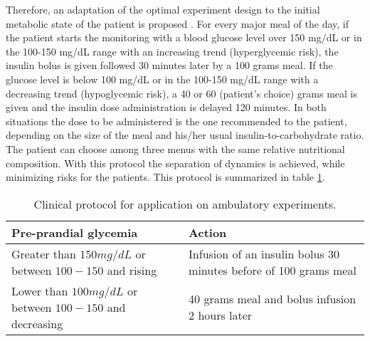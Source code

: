 Therefore, an adaptation of the optimal experiment design to the initial metabolic state of the patient is proposed \cite{DTMlaguna2010}. For every major meal of the day, if the patient starts the monitoring with a blood glucose level over 150 mg/dL or in the 100-150 mg/dL range with an increasing trend (hyperglycemic risk), the insulin bolus is given followed 30 minutes later by a 100 grams meal. If the glucose level is below 100 mg/dL or in the 100-150 mg/dL range with a decreasing trend (hypoglycemic risk), a 40 or 60 (patient's choice) grams meal is given and the insulin dose administration is delayed 120 minutes. In both situations the dose to be administered is the one recommended to the patient, depending on the size of the meal and his/her usual insulin-to-carbohydrate ratio. The patient can choose among three menus with the same relative nutritional composition. With this protocol the separation of dynamics is achieved, while minimizing risks for the patients. This protocol is summarized in table \ref{tab:protocol}.

\begin{table}[hbt]
	\centering
	\begin{tabular}{| p{} | p{} |}
	\hline 
	\textbf{Pre-prandial glycemia} & \textbf{Action}\\
	\hline 
	Greater than $150 mg/dL$ or between $100-150$ and rising & Infusion of an insulin bolus 30 minutes before of 100 grams meal \\
	\hline 
	Lower than $100 mg/dL$ or between $100-150$ and decreasing & 40 grams meal and bolus infusion 2 hours later \\
	\hline 
	\end{tabular}
\caption{Clinical protocol for application on ambulatory experiments.}
\label{tab:protocol}
\end{table}

